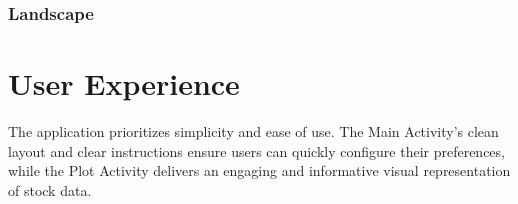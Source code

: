 \documentclass{article}
\begin{document}
\subsubsection{Landscape}


\section{User Experience}
The application prioritizes simplicity and ease of use. The Main Activity's clean layout and clear instructions ensure users can quickly configure their preferences, while the Plot Activity delivers an engaging and informative visual representation of stock data.




\end{document}
